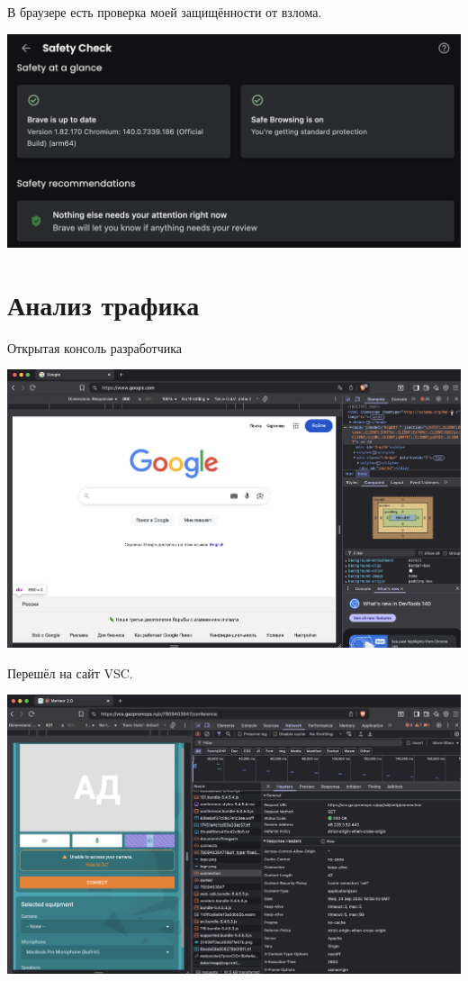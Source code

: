\documentclass{article}
\begin{document}
В браузере есть проверка моей защищённости от взлома.

\begin{center}
  \includegraphics[width=.9\textwidth]{5}
\end{center}

\section{Анализ трафика}

Открытая консоль разработчика

\begin{center}
  \includegraphics[width=.9\textwidth]{6}
\end{center}

Перешёл на сайт VSC.

\begin{center}
  \includegraphics[width=.9\textwidth]{7}
\end{center}
\end{document}
